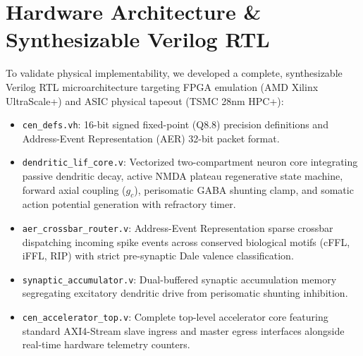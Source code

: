 \documentclass[11pt,letterpaper]{report}
\begin{document}
\section{Hardware Architecture \& Synthesizable Verilog RTL}

To validate physical implementability, we developed a complete, synthesizable Verilog RTL microarchitecture targeting FPGA emulation (AMD Xilinx UltraScale+) and ASIC physical tapeout (TSMC 28nm HPC+):
\begin{itemize}[leftmargin=*]
    \item \texttt{cen\_defs.vh}: 16-bit signed fixed-point (Q8.8) precision definitions and Address-Event Representation (AER) 32-bit packet format.
    \item \texttt{dendritic\_lif\_core.v}: Vectorized two-compartment neuron core integrating passive dendritic decay, active NMDA plateau regenerative state machine, forward axial coupling ($g_c$), perisomatic GABA shunting clamp, and somatic action potential generation with refractory timer.
    \item \texttt{aer\_crossbar\_router.v}: Address-Event Representation sparse crossbar dispatching incoming spike events across conserved biological motifs (cFFL, iFFL, RIP) with strict pre-synaptic Dale valence classification.
    \item \texttt{synaptic\_accumulator.v}: Dual-buffered synaptic accumulation memory segregating excitatory dendritic drive from perisomatic shunting inhibition.
    \item \texttt{cen\_accelerator\_top.v}: Complete top-level accelerator core featuring standard AXI4-Stream slave ingress and master egress interfaces alongside real-time hardware telemetry counters.
\end{itemize}
\end{document}
